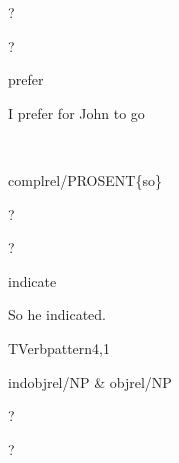 
\begin{thetadescr}
\evitem ?
\esitem
     \begin{examples}
        \example  ?
     \end{examples}
\end{thetadescr}



\begin{thetadescr}
\evitem prefer
\esitem
     \begin{examples}
        \example I prefer for John to go
     \end{examples}
\end{thetadescr}


\newpage
\verbpattern{[synFRONTSOPROSENT] }
\begin{vpattern}
 \norule
\csritem \mbox{}\\
     \begin{csr}
      complrel/PROSENT\{so\}
     \end{csr}
\remarksitem
\end{vpattern}


\begin{thetadescr}
\evitem ?
\esitem
     \begin{examples}
        \example  ?
     \end{examples}
\end{thetadescr}



\begin{thetadescr}
\evitem indicate
\esitem
     \begin{examples}
        \example So he indicated.
     \end{examples}
\end{thetadescr}


\newpage
{}
\begin{vpattern}
 TVerbpattern4,1
\csritem \mbox{}\\
     \begin{csr}
      indobjrel/NP & objrel/NP
     \end{csr}
\remarksitem
\end{vpattern}


\begin{thetadescr}
\evitem ?
\esitem
     \begin{examples}
        \example ?
     \end{examples}
\end{thetadescr}


